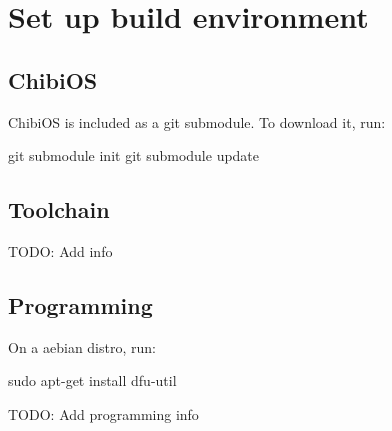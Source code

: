 \section*{Set up build environment}

\subsection*{Chibi\-O\-S}

Chibi\-O\-S is included as a git submodule. To download it, run\-: \begin{DoxyVerb}git submodule init
git submodule update
\end{DoxyVerb}


\subsection*{Toolchain}

T\-O\-D\-O\-: Add info

\subsection*{Programming}

On a aebian distro, run\-: \begin{DoxyVerb}sudo apt-get install dfu-util
\end{DoxyVerb}


T\-O\-D\-O\-: Add programming info 